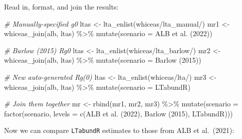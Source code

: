 \documentclass[
]{book}
\newenvironment{Shaded}{\begin{snugshade}}{\end{snugshade}}
\newcommand{\AttributeTok}[1]{\textcolor[rgb]{0.77,0.63,0.00}{#1}}
\newcommand{\CommentTok}[1]{\textcolor[rgb]{0.56,0.35,0.01}{\textit{#1}}}
\newcommand{\FunctionTok}[1]{\textcolor[rgb]{0.00,0.00,0.00}{#1}}
\newcommand{\NormalTok}[1]{#1}
\newcommand{\OtherTok}[1]{\textcolor[rgb]{0.56,0.35,0.01}{#1}}
\newcommand{\SpecialCharTok}[1]{\textcolor[rgb]{0.00,0.00,0.00}{#1}}
\newcommand{\StringTok}[1]{\textcolor[rgb]{0.31,0.60,0.02}{#1}}
\begin{document}
Read in, format, and join the results:

\begin{Shaded}
\begin{Highlighting}[]
\CommentTok{\# Manually{-}specified g0}
\NormalTok{ltas }\OtherTok{\textless{}{-}} \FunctionTok{lta\_enlist}\NormalTok{(}\StringTok{\textquotesingle{}whiceas/lta\_manual/\textquotesingle{}}\NormalTok{)}
\NormalTok{mr1 }\OtherTok{\textless{}{-}} \FunctionTok{whiceas\_join}\NormalTok{(alb, ltas) }\SpecialCharTok{\%\textgreater{}\%} \FunctionTok{mutate}\NormalTok{(}\AttributeTok{scenario =} \StringTok{\textquotesingle{}ALB et al. (2022)\textquotesingle{}}\NormalTok{)}

\CommentTok{\# Barlow (2015) Rg0}
\NormalTok{ltas }\OtherTok{\textless{}{-}} \FunctionTok{lta\_enlist}\NormalTok{(}\StringTok{\textquotesingle{}whiceas/lta\_barlow/\textquotesingle{}}\NormalTok{)}
\NormalTok{mr2 }\OtherTok{\textless{}{-}} \FunctionTok{whiceas\_join}\NormalTok{(alb, ltas) }\SpecialCharTok{\%\textgreater{}\%} \FunctionTok{mutate}\NormalTok{(}\AttributeTok{scenario =} \StringTok{\textquotesingle{}Barlow (2015)\textquotesingle{}}\NormalTok{)}

\CommentTok{\# New auto{-}generated Rg(0)}
\NormalTok{ltas }\OtherTok{\textless{}{-}} \FunctionTok{lta\_enlist}\NormalTok{(}\StringTok{\textquotesingle{}whiceas/lta/\textquotesingle{}}\NormalTok{)}
\NormalTok{mr3 }\OtherTok{\textless{}{-}} \FunctionTok{whiceas\_join}\NormalTok{(alb, ltas) }\SpecialCharTok{\%\textgreater{}\%} \FunctionTok{mutate}\NormalTok{(}\AttributeTok{scenario =} \StringTok{\textquotesingle{}LTabundR\textquotesingle{}}\NormalTok{)}

\CommentTok{\# Join them together}
\NormalTok{mr }\OtherTok{\textless{}{-}} \FunctionTok{rbind}\NormalTok{(mr1, mr2, mr3) }\SpecialCharTok{\%\textgreater{}\%} 
  \FunctionTok{mutate}\NormalTok{(}\AttributeTok{scenario =} \FunctionTok{factor}\NormalTok{(scenario, }\AttributeTok{levels =} \FunctionTok{c}\NormalTok{(}\StringTok{\textquotesingle{}ALB et al. (2022)\textquotesingle{}}\NormalTok{,}
                                                \StringTok{\textquotesingle{}Barlow (2015)\textquotesingle{}}\NormalTok{,}
                                                \StringTok{\textquotesingle{}LTabundR\textquotesingle{}}\NormalTok{)))}
\end{Highlighting}
\end{Shaded}

Now we can compare \texttt{LTabundR} estimates to those from ALB et al.~(2021):
\end{document}
